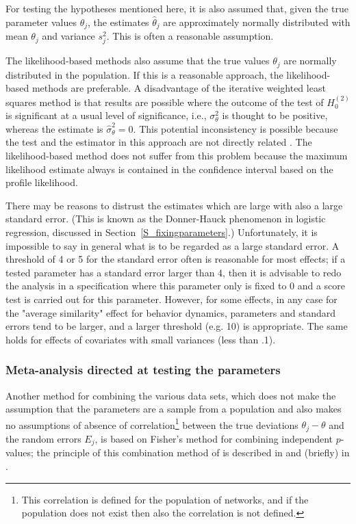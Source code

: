 \documentclass[a4paper,fleqn,11pt]{article}
\newcommand{\+}{\, + \,}
\begin{document}
For testing the hypotheses mentioned here, it is also assumed that,
given the true parameter values $\theta_j$, the
estimates $\hat{\theta}_j$ are approximately normally distributed
with mean $\theta_j$ and variance $s^2_j$.
This is often a reasonable assumption.

The likelihood-based methods also assume that the true values
$\theta_j$ are normally distributed in the population.
If this is a reasonable approach, the likelihood-based methods
are preferable.
A disadvantage of the iterative weighted least squares method
is that results are possible
where the outcome of the test of $H_0^{(2)}$ is significant
at a usual level of significance,
i.e., $\sigma^2_\theta$ is thought to be positive, whereas
the estimate is $\hat\sigma^2_\theta = 0$.
This  potential inconsistency is possible because the test
and the estimator in this approach are not directly related
\citep[cf.][]{SnijdersBaerveldt03}.
The likelihood-based method does not suffer from this problem
because the maximum likelihood estimate always is contained
in the confidence interval based on the profile likelihood.
\bigskip

There may be reasons to distrust the estimates which are
large with also a large standard error. (This is known as the Donner-Hauck
phenomenon in logistic regression, discussed in
Section~\ref{S_fixingparameters}.)
Unfortunately, it is impossible to say in
general what is to be regarded as a large standard error.
A threshold of 4 or 5 for the standard error often is reasonable
for most effects; if a tested
parameter has a standard error larger than 4, then it is advisable to redo
the analysis in a specification where this parameter only is fixed to 0 and a
score test is carried out for this parameter. However, for some effects, in
any case for the "average similarity" effect for behavior dynamics,
parameters and standard errors tend to be larger, and a larger threshold
(e.g. 10) is appropriate. The same holds for effects of covariates with small
variances (less than .1).

\subsubsection{Meta-analysis directed at testing the parameters}

Another method for combining the various data sets,
which does not make the assumption
that the parameters are a sample from a population and also
makes no assumptions of absence of correlation\footnote{This correlation
is defined for the population of networks, and if the population
does not exist then also the correlation is not defined.}
between the true deviations $\theta_j - \theta$
and the random errors $E_j$,
is based on Fisher's method for combining independent $p$-values;
the principle of this combination method of \citet{Fisher32} is described in
\citet{HedgesOlkin85}    and (briefly) in \citet[Chapter 3]{SnijdersBosker12}.
\end{document}
